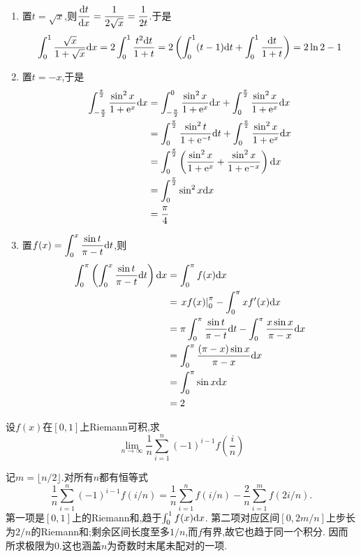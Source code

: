 \documentclass{ctexart}
\begin{document}
\begin{solution}
    \begin{enumerate}[label=\textbf{(\arabic*)}]
        \item 置$t=\sqrt{x}$,则$\dfrac{\mathrm{d} t}{\mathrm{d} x}=\dfrac{1}{2\sqrt{x}}=\dfrac{1}{2t}$.于是
            $$\int_0^1\dfrac{\sqrt{x}}{1+\sqrt{x}}\mathrm{d} x=2\int_0^1\dfrac{t^2\mathrm{d} t}{1+t}=2\left(\int_0^1(t-1)\mathrm{d} t+\int_0^1\dfrac{\mathrm{d} t}{1+t}\right)=2\ln2-1$$
        \item 置$t=-x$,于是
            $$\begin{aligned}
                \int_{-\frac{\pi}{2}}^{\frac{\pi}{2}}\dfrac{\sin^2x}{1+\mathrm{e}^x}\mathrm{d} x
                &= \int_{-\frac{\pi}{2}}^{0}\dfrac{\sin^2x}{1+\mathrm{e}^x}\mathrm{d} x+\int_{0}^{\frac{\pi}{2}}\dfrac{\sin^2x}{1+\mathrm{e}^x}\mathrm{d} x \\
                &= \int_{0}^{\frac{\pi}{2}}\dfrac{\sin^2t}{1+\mathrm{e}^{-t}}\mathrm{d} t+\int_{0}^{\frac{\pi}{2}}\dfrac{\sin^2x}{1+\mathrm{e}^x}\mathrm{d} x \\
                &= \int_{0}^{\frac{\pi}{2}}\left(\dfrac{\sin^2x}{1+\mathrm{e}^x}+\dfrac{\sin^2x}{1+\mathrm{e}^{-x}}\right)\mathrm{d} x \\
                &= \int_{0}^{\frac{\pi}{2}}\sin^2x\mathrm{d} x \\
                &= \dfrac{\pi}{4}
            \end{aligned}$$
        \item 置$\displaystyle f(x)=\int_0^x\dfrac{\sin t}{\pi-t}\mathrm{d} t$,则
            $$\begin{aligned}
                \int_{0}^{\pi}\left(\int_{0}^{x}\dfrac{\sin t}{\pi-t}\mathrm{d} t\right)\mathrm{d} x
                &= \int_{0}^{\pi}f(x)\mathrm{d} x \\
                &= \left.xf(x)\right|_0^{\pi}-\int_0^\pi xf'(x)\mathrm{d} x \\
                &= \pi\int_0^\pi\dfrac{\sin t}{\pi-t}\mathrm{d} t-\int_0^\pi\dfrac{x\sin x}{\pi-x}\mathrm{d} x \\
                &= \int_0^\pi\dfrac{(\pi-x)\sin x}{\pi-x}\mathrm{d} x \\
                &= \int_0^\pi\sin x\mathrm{d} x \\
                &= 2
            \end{aligned}$$
    \end{enumerate}
\end{solution}
\begin{problem}[6.(10\songti{分})]
    设$f(x)$在$[0,1]$上Riemann可积,求$$\lim_{n\to\infty}\dfrac{1}{n}\sum_{i=1}^{n}(-1)^{i-1}f\left(\dfrac{i}{n}\right)$$
\end{problem}
\begin{solution}
记$m=\lfloor n/2\rfloor$.对所有$n$都有恒等式
    \[\dfrac1n\sum_{i=1}^n(-1)^{i-1}f(i/n)
    =\dfrac1n\sum_{i=1}^nf(i/n)-\dfrac2n\sum_{i=1}^mf(2i/n).\]
    第一项是$[0,1]$上的Riemann和,趋于$\int_0^1f(x)\mathrm{d} x$.
    第二项对应区间$[0,2m/n]$上步长为$2/n$的Riemann和;剩余区间长度至多$1/n$,而$f$有界,故它也趋于同一个积分.
    因而所求极限为$0$.这也涵盖$n$为奇数时末尾未配对的一项.
\end{solution}
\end{document}
